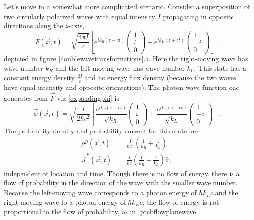 \documentclass[12pt,secnumarabic,amsmath,amssymb,balancelastpage,nofootinbib]{article}
\begin{document}
Let's move to a somewhat more complicated scenario.  Consider a superposition of two circularly polarized waves with equal intensity $I$ propagating in opposite directions along the $z$-axis,
\begin{equation}
\vec{F}(\vec{x},t) = \sqrt{\frac{4 \pi I}{c}}\left[
e^{i k_R (z-ct)}
\begin{pmatrix}
1 \\
i \\
0
\end{pmatrix}
+
e^{i k_L (z+ct)}
\begin{pmatrix}
1 \\
-i \\
0
\end{pmatrix}
\right]
\ ,
\label{twowavefield}
\end{equation}
depicted in figure \ref{doublewavetransformations}.a.  Here the right-moving wave has wave number $k_R$ and the left-moving wave has wave number $k_L$.  This state has a constant energy density $\frac{2I}{c}$ and no energy flux density (because the two waves have equal intensity and opposite orientations).  The photon wave function one generates from $\vec{F}$ via \eqref{expandingphi} is
\begin{equation}
\vec{\phi}(\vec{x},t) = \sqrt{\frac{I}{2 \hbar c^2}}\left[
\frac{e^{i k_R (z-ct)}}{\sqrt{k_R}}
\begin{pmatrix}
1 \\
i \\
0
\end{pmatrix}
+
\frac{e^{i k_L (z+ct)}}{\sqrt{k_L}}
\begin{pmatrix}
1 \\
-i \\
0
\end{pmatrix}
\right]
\ .
\label{twowavestate}
\end{equation}
The probability density and probability current for this state are
\begin{align}
\rho^{\,p}(\vec{x},t)&=\frac{I}{\hbar c^2}\left(\frac{1}{k_R}+\frac{1}{k_L}\right)
\nonumber
\\
\vec{J}^{\:p}(\vec{x},t)&=\frac{I}{\hbar c}\left(\frac{1}{k_R}-\frac{1}{k_L}\right)\hat{z}
\ ,
\label{probflowsuperposition}
\end{align}
independent of location and time.  Though there is no flow of energy, there is a flow of probability in the direction of the wave with the smaller wave number.  Because the left-moving wave corresponds to a photon energy of $\hbar k_L c$ and the right-moving wave to a photon energy of $\hbar k_R c$, the flow of energy is not proportional to the flow of probability, as in \eqref{probflowplanewave}.
\end{document}
